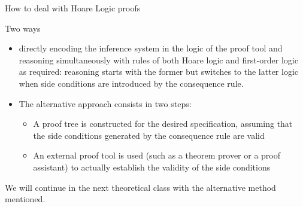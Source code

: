 \documentclass[aspectratio=169]{beamer}
\begin{document}
\begin{slide}{How to deal with Hoare Logic proofs}
  \begin{block}{Two ways}
  \begin{itemize}
    \item directly encoding the inference system in the logic of the proof tool and reasoning simultaneously with rules of both Hoare logic and first-order logic as required: reasoning starts with the former but switches to the latter logic when side conditions are introduced by the consequence rule.
    \item The alternative approach consists in two steps:
      \begin{itemize}
        \item A proof tree is constructed for the desired specification, assuming that the side conditions generated by the consequence rule are valid
        \item An external proof tool is used (such as a theorem prover or a proof assistant) to actually establish the validity of the side conditions
      \end{itemize}
  \end{itemize}
    
  \end{block}
\alert{We will continue in the next theoretical class with the alternative method mentioned}. %
\end{slide}




%
%
\end{document}
